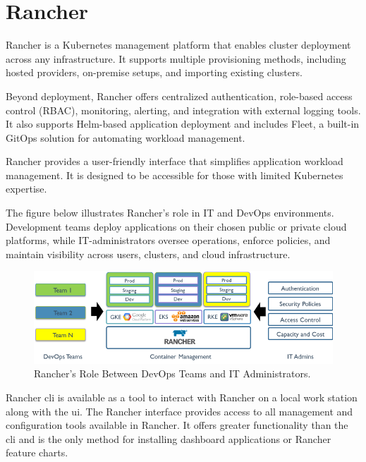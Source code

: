\documentclass[../main.tex]{subfiles}
\begin{document}
\section{Rancher}

Rancher is a Kubernetes management platform that enables cluster deployment across any infrastructure. It supports multiple provisioning methods, including hosted providers, on-premise setups, and importing existing clusters. 

Beyond deployment, Rancher offers centralized authentication, role-based access control (RBAC), monitoring, alerting, and integration with external logging tools. It also supports Helm-based application deployment and includes Fleet, a built-in GitOps solution for automating workload management. \cite{rancher}

Rancher provides a user-friendly interface that simplifies application workload management. It is designed to be accessible for those with limited Kubernetes expertise.

The figure below illustrates Rancher’s role in IT and DevOps environments. Development teams deploy applications on their chosen public or private cloud platforms, while IT-administrators oversee operations, enforce policies, and maintain visibility across users, clusters, and cloud infrastructure.

\begin{figure}[H]
    \centering
    \includegraphics[scale=0.5]{img/3-background/rancher/rancher_devops_teams.png}
    \caption{Rancher’s Role Between DevOps Teams and IT Administrators. \protect\footnotemark}
    \label{fig:rancher_devops_teams}
\end{figure}


Rancher \gls{cli} is available as a tool to interact with Rancher on a local work station along with the \gls{ui}. The Rancher interface provides access to all management and configuration tools available in Rancher. It offers greater functionality than the \gls{cli} and is the only method for installing dashboard applications or Rancher feature charts.
\end{document}
